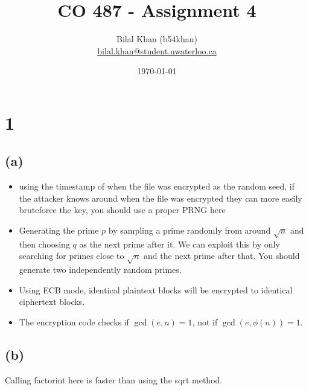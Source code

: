 \documentclass[11pt]{article}
\title{CO 487 - Assignment 4}
\author{Bilal Khan (b54khan)\\
\href{mailto:bilal.khan@student.uwaterloo.ca}{bilal.khan@student.uwaterloo.ca}}
\date{\today}
\begin{document}
\maketitle

\tableofcontents

\section{1}

\subsection{(a)}

\begin{itemize}
  \item using the timestamp of when the file was encrypted as the random seed, if the attacker knows around when the file was encrypted they can more easily bruteforce the key, you should use a proper PRNG here
  \item Generating the prime $p$ by sampling a prime randomly from around $\sqrt{n}$ and then choosing $q$ as the next prime after it. We can exploit this by only searching for primes close to $\sqrt{n}$ and the next prime after that. You should generate two independently random primes.
  \item Using ECB mode, identical plaintext blocks will be encrypted to identical ciphertext blocks. 
  \item The encryption code checks if $\gcd(e, n) = 1$, not if $\gcd(e, \phi(n)) = 1$. 
\end{itemize}

\subsection{(b)}

Calling factorint here is faster than using the sqrt method.
\end{document}
